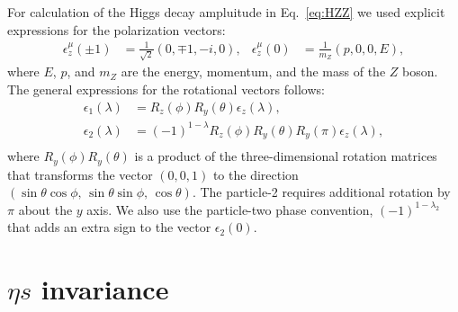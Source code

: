 \documentclass[prd,preprintnumbers,floatfix,
nofootinbib,superscriptaddress]{revtex4}
\begin{document}
For calculation of the Higgs decay ampluitude in Eq.~\eqref{eq:HZZ}
we used explicit expressions for the polarization vectors:
\begin{align}
  \epsilon_z^{\mu}(\pm1) &= \frac{1}{\sqrt{2}} \left( 0,\mp 1,-i,0 \right), &
  \epsilon_z^{\mu}(0) &= \frac{1}{m_Z} \left(p,0,0,E\right),
\end{align}
where $E$, $p$, and $m_Z$ are the energy, momentum, and the mass of the $Z$ boson.
The general expressions for the rotational vectors follows:
\begin{align}
  \epsilon_1(\lambda) &= R_z(\phi) R_y(\theta) \epsilon_z(\lambda),\\
  \epsilon_2(\lambda) &= (-1)^{1-\lambda} R_z(\phi) R_y(\theta) R_y(\pi) \epsilon_z(\lambda),\\
\end{align}
where $R_y(\phi)R_y(\theta)$ is a product of the three-dimensional rotation matrices
that transforms the vector $(0,0,1)$ to the direction $(\sin\theta\cos\phi,\,\sin\theta\sin\phi,\,\cos\theta)$.
The particle-2 requires additional rotation by $\pi$ about the $y$ axis. We also use the particle-two phase convention,
$(-1)^{1-\lambda_2}$ that adds an extra sign to the vector $\epsilon_2(0)$.

\section{$\eta s$ invariance}
\end{document}
